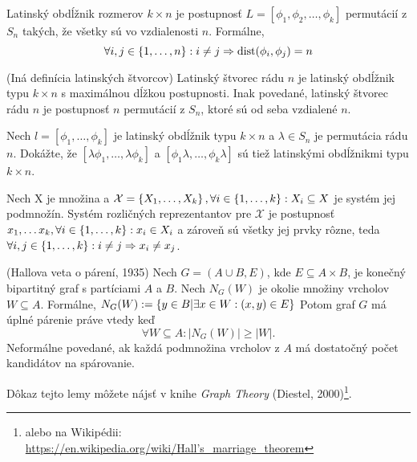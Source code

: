 \begin{definition}
Latinský obdĺžnik rozmerov $k \times n$ je postupnosť $L = [\phi_1, \phi_2, \ldots, \phi_k]$ permutácií z $S_n$ takých, že všetky sú vo vzdialenosti $n$. 
Formálne, 
$$\forall i, j \in \left\{1, \ldots, n\right\}: i \neq j \Rightarrow {\rm dist}(\phi_i, \phi_j) = n$$
\end{definition}

\begin{definition}{(Iná definícia latinských štvorcov)}
Latinský štvorec rádu $n$ je latinský obdĺžnik typu $k \times n$ s maximálnou dĺžkou postupnosti. 
Inak povedané, latinský štvorec rádu $n$ je postupnosť $n$ permutácií z $S_n$, ktoré sú od seba vzdialené $n$.
\end{definition}


\begin{exercise}
Nech $l = [\phi_1, \ldots, \phi_k]$ je latinský obdĺžnik typu $k \times n$ a $\lambda \in S_n$ je permutácia rádu $n$.
Dokážte, že $[\lambda \phi_1, \ldots, \lambda \phi_k]$ a $[\phi_1 \lambda, \ldots, \phi_k \lambda]$ sú tiež latinskými obdĺžnikmi typu $k \times n$.
\end{exercise}


\begin{definition}
Nech X je množina a $\mathcal{X} = \left\{X_1, \ldots, X_k\right\}, \forall i \in \left\{1, \ldots, k\right\}: X_i \subseteq X$ je systém jej podmnožín.
Systém rozličných reprezentantov pre $\mathcal{X}$ je postupnosť $x_1, \ldots x_k, \forall i \in \left\{1, \ldots, k\right\}: x_i \in X_i$ 
a zároveň sú všetky jej prvky rôzne, teda $\forall i, j \in \left\{1, \ldots, k\right\}: i \neq j \Rightarrow  x_i \neq x_j$.
\end{definition}

\begin{lemma}{(Hallova veta o párení, 1935)}
Nech $G = (A \cup B, E)$, kde $E \subseteq A \times B$, je konečný bipartitný graf s partíciami $A$ a $B$.
Nech $N_G(W)$ je okolie množiny vrcholov $W \subseteq A$.
Formálne, $N_G(W) := \left\{y \in B| \exists x \in W: (x, y) \in E\right\} $
Potom graf $G$ má úplné párenie práve vtedy keď $$\forall W \subseteq A: |N_G(W)| \geq |W|.$$
Neformálne povedané, ak každá podmnožina vrcholov z $A$ má dostatočný počet kandidátov na spárovanie.
\end{lemma}
Dôkaz tejto lemy môžete nájsť v knihe \emph{Graph Theory} (Diestel, 2000)\footnote{alebo na Wikipédii: \href{https://en.wikipedia.org/wiki/Hall\%27s_marriage_theorem}{https://en.wikipedia.org/wiki/Hall's\_marriage\_theorem}}.

